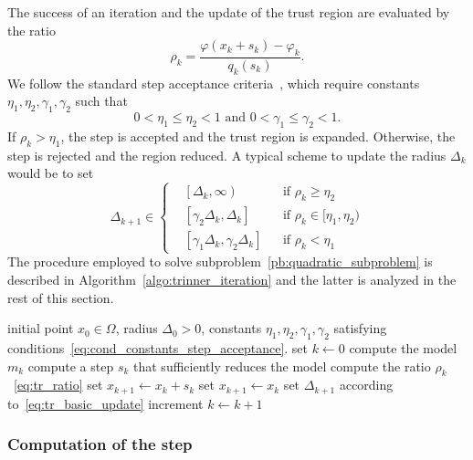 The success of an iteration and the update of the trust region are evaluated by the ratio
\begin{equation}\label{eq:tr_ratio}
	\rho_k = \dfrac{\varphi(x_k+s_k)-\varphi_k}{q_k(s_k)}.
\end{equation}
We follow the standard step acceptance criteria~\cite{conn-etal:2000}, which require constants $\eta_1, \eta_2, \gamma_1, \gamma_2$ such that 
\begin{equation}\label{eq:cond_constants_step_acceptance}
	0< \eta_1 \le \eta_2 < 1 \text{ and } 0< \gamma_1 \le \gamma_2 < 1.
\end{equation}
If $\rho_k  > \eta_1$, the step is accepted and the trust region is expanded. Otherwise, the step is rejected and the region reduced. A typical scheme to update the radius $\Delta_k$ would be to set
\begin{equation}\label{eq:tr_basic_update}
	\Delta_{k+1} \in \left\{\begin{aligned}
		& \left[\Delta_k,\infty\right) & &\text{if } \rho_k \ge \eta_2 \\
		& \left[\gamma_2\Delta_k, \Delta_k\right]  & &\text{if } \rho_k \in [\eta_1,\eta_2) \\
		& \left[\gamma_1\Delta_k, \gamma_2\Delta_k\right]  & &\text{if }  \rho_k<\eta_1
	\end{aligned}\right.
\end{equation}
The procedure employed to solve subproblem~\eqref{pb:quadratic_subproblem} is described in Algorithm~\ref{algo:trinner_iteration} and the latter is analyzed in the rest of this section. 
\begin{algorithm}
	\caption{Trust region inner iteration algorithm}
	\label{algo:trinner_iteration}
	\begin{algorithmic}[1]
		\Require initial point $x_0 \in \Omega$, radius $\Delta_0 >0$, constants $\eta_1, \eta_2, \gamma_1, \gamma_2$ satisfying conditions~\eqref{eq:cond_constants_step_acceptance}.
		\State set $k \gets 0$ 
		\Repeat{}
		\State compute the model $m_k$
		\State compute a step $s_k$ that sufficiently reduces the model
		\State compute the ratio $\rho_k$~\eqref{eq:tr_ratio}
		 set $x_{k+1}\gets x_k+s_k$ \Else{} set $x_{k+1} \gets x_k$ \EndIf
		\State set $\Delta_{k+1}$ according to~\eqref{eq:tr_basic_update}
		\State increment $k\gets k+1$
	\end{algorithmic}
\end{algorithm}

\subsubsection{Computation of the step}\label{subsec:step_computation}

